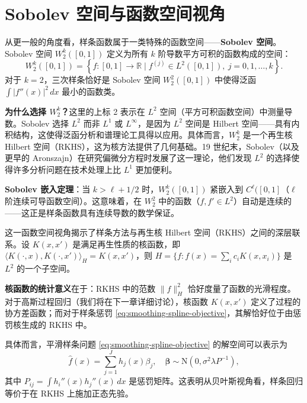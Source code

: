 \section{Sobolev 空间与函数空间视角}\label{sec:sobolev-spaces}

从更一般的角度看，样条函数属于一类特殊的函数空间——\textbf{Sobolev 空间}。Sobolev 空间 $W_2^k([0, 1])$ 定义为所有 $k$ 阶导数平方可积的函数构成的空间：
\begin{equation}
W_2^k([0, 1]) = \left\{ f : [0, 1] \to \mathbb{R} \mid f^{(j)} \in L^2([0, 1]),\ j = 0, 1, \ldots, k \right\}.
\label{eq:sobolev-space-definition}
\end{equation}
对于 $k=2$，三次样条恰好是 Sobolev 空间 $W_2^2([0, 1])$ 中使得泛函 $\int |f''(x)|^2\, dx$ 最小的函数类。

\textbf{为什么选择 $W_2^k$？}这里的上标 2 表示在 $L^2$ 空间（平方可积函数空间）中测量导数。Sobolev 选择 $L^2$ 而非 $L^1$ 或 $L^\infty$，是因为 $L^2$ 空间是 Hilbert 空间——具有内积结构，这使得泛函分析和谱理论工具得以应用。具体而言，$W_2^k$ 是一个再生核 Hilbert 空间（RKHS），这为核方法提供了几何基础。19 世纪末，Sobolev（以及更早的 Aronszajn）在研究偏微分方程时发展了这一理论，他们发现 $L^2$ 的选择使得许多分析问题在技术处理上比 $L^1$ 更加便利。

\textbf{Sobolev 嵌入定理}：当 $k > \ell + 1/2$ 时，$W_2^k([0, 1])$ 紧嵌入到 $C^\ell([0, 1]$（$\ell$ 阶连续可导函数空间）。这意味着，在 $W_2^2$ 中的函数（$f, f' \in L^2$）自动是连续的——这正是样条函数具有连续导数的数学保证。

这一函数空间视角揭示了样条方法与再生核 Hilbert 空间（RKHS）之间的深层联系。设 $K(x, x')$ 是满足再生性质的核函数，即 $\langle K(\cdot, x), K(\cdot, x') \rangle_H = K(x, x')$，则 $H = \{f : f(x) = \sum_i c_i K(x, x_i)\}$ 是 $L^2$ 的一个子空间。

\textbf{核函数的统计意义}在于：RKHS 中的范数 $\|f\|_H^2$ 恰好度量了函数的光滑程度。对于高斯过程回归（我们将在下一章详细讨论），核函数 $K(x, x')$ 定义了过程的协方差函数；而对于样条惩罚 \eqref{eq:smoothing-spline-objective}，其解恰好位于由惩罚核生成的 RKHS 中。

具体而言，平滑样条问题 \eqref{eq:smoothing-spline-objective} 的解空间可以表示为
\begin{equation}
\hat{f}(x) = \sum_{j=1}^{J} h_j(x) \beta_j,\quad \boldsymbol{\beta} \sim \mathrm{N}(0, \sigma^2 \lambda P^{-1}),
\label{eq:sobolev-rkhs-representation}
\end{equation}
其中 $P_{ij} = \int h_i''(x) h_j''(x)\, dx$ 是惩罚矩阵。这表明从贝叶斯视角看，样条回归等价于在 RKHS 上施加正态先验。

